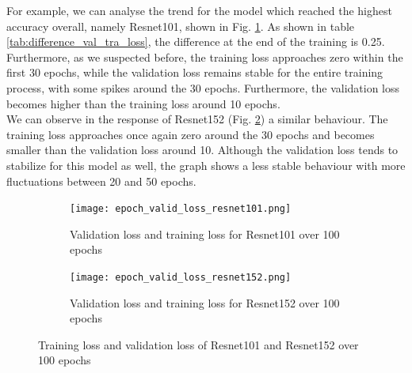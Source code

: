 For example, we can analyse the trend for the model which reached the highest accuracy overall, namely Resnet101, shown in Fig. \ref{fig:epoch_valid_loss_resnet101}. As shown in table \ref{tab:difference_val_tra_loss}, the difference at the end of the training is 0.25. Furthermore, as we suspected before, the training loss approaches zero within the first 30 epochs, while the validation loss remains stable for the entire training process, with some spikes around the 30 epochs. Furthermore, the validation loss becomes higher than the training loss around 10 epochs.\\
We can observe in the response of Resnet152 (Fig. \ref{fig:epoch_valid_loss_resnet152}) a similar behaviour. The training loss approaches once again zero around the 30 epochs and becomes smaller than the validation loss around 10. Although the validation loss tends to stabilize for this model as well, the graph shows a less stable behaviour with more fluctuations between 20 and 50 epochs. \\
\begin{figure}[h]
\begin{subfigure}{0.5\textwidth}
     \centering
	    \texttt{[image: epoch\_valid\_loss\_resnet101.png]}
\caption{Validation loss and training loss for Resnet101 over 100 epochs}\label{fig:epoch_valid_loss_resnet101}
     \end{subfigure}
\begin{subfigure}{0.5\textwidth}
     \centering
	    \texttt{[image: epoch\_valid\_loss\_resnet152.png]}
\caption{Validation loss and training loss for Resnet152 over 100 epochs}\label{fig:epoch_valid_loss_resnet152}
     \end{subfigure}  
     \caption{Training loss and validation loss of Resnet101 and Resnet152 over 100 epochs}
        \label{fig:tran_valid_loss_seeds_res_100}
\end{figure}



